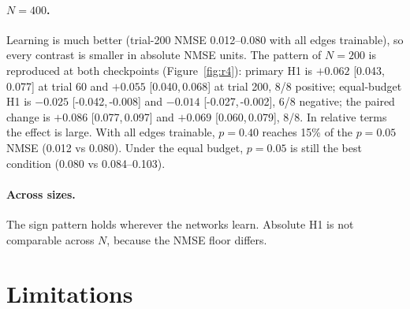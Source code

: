 \documentclass[11pt]{article}
\newcommand{\ci}[2]{[#1,\,#2]}
\begin{document}
\paragraph{$N=400$.} Learning is much better (trial-200 NMSE 0.012--0.080
with all edges trainable), so every contrast is smaller in absolute NMSE
units. The pattern of $N=200$ is reproduced at both checkpoints
(Figure~\ref{fig:r4}): primary H1 is $+0.062$ \ci{0.043}{0.077} at trial 60
and $+0.055$ \ci{0.040}{0.068} at trial 200, 8/8 positive; equal-budget H1 is
$-0.025$ \ci{-0.042}{-0.008} and $-0.014$ \ci{-0.027}{-0.002}, 6/8 negative;
the paired change is $+0.086$ \ci{0.077}{0.097} and $+0.069$
\ci{0.060}{0.079}, 8/8. In relative terms the effect is large. With all edges
trainable, $p=0.40$ reaches 15\% of the $p=0.05$ NMSE (0.012 vs 0.080). Under
the equal budget, $p=0.05$ is still the best condition (0.080 vs
0.084--0.103).

\paragraph{Across sizes.} The sign pattern holds wherever the networks learn.
Absolute H1 is not comparable across $N$, because the NMSE floor differs.

\section{Limitations}
\end{document}
